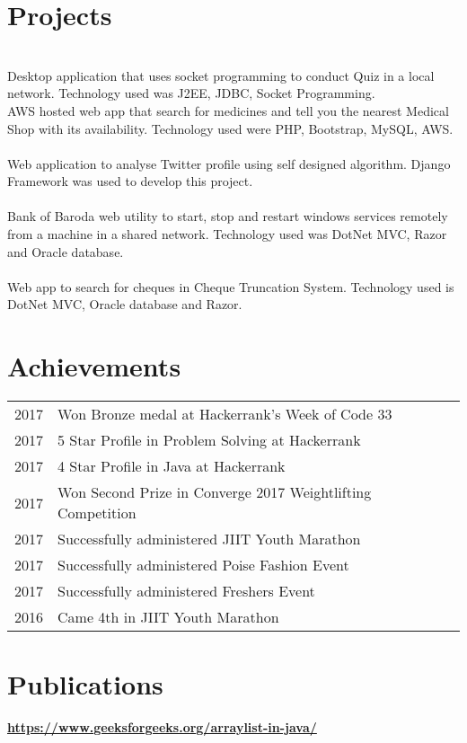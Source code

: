 \documentclass[]{deedy-resume-openfont}
\begin{document}
\begin{minipage}[t]{0.66\textwidth}
\section{Projects}
\\
Desktop application that uses socket programming to conduct Quiz in a local
network. Technology used was J2EE, JDBC, Socket Programming.
\\
AWS hosted web app that search for medicines and tell you the nearest Medical Shop with its availability. Technology used were PHP, Bootstrap, MySQL,
AWS.\\
\\
Web application to analyse Twitter profile using self designed algorithm. Django Framework was used to develop this project.\\
\\
Bank of Baroda web utility to start, stop and restart windows services
remotely from a machine in a shared network. Technology used was DotNet MVC, Razor
and Oracle database.\\
\\
Web app to search for cheques in Cheque Truncation System. Technology used is DotNet MVC, Oracle database and Razor.\\
\sectionsep


\section{Achievements} 
\begin{tabular}{rll}
2017	     & Won Bronze medal at Hackerrank's Week of Code 33\\
2017	     & 5 Star Profile in Problem Solving at Hackerrank\\
2017	     & 4 Star Profile in Java at Hackerrank\\
2017	     & Won Second Prize in Converge 2017 Weightlifting Competition\\
2017	     & Successfully administered JIIT Youth Marathon\\
2017	     & Successfully administered Poise Fashion Event\\
2017	     & Successfully administered Freshers Event\\
2016	     & Came 4th in JIIT Youth Marathon\\

\end{tabular}
\sectionsep


\section{Publications} 
\textbullet{} \href{https://www.geeksforgeeks.org/arraylist-in-java/}{\bf https://www.geeksforgeeks.org/arraylist-in-java/}


\end{minipage} 
\end{document}
